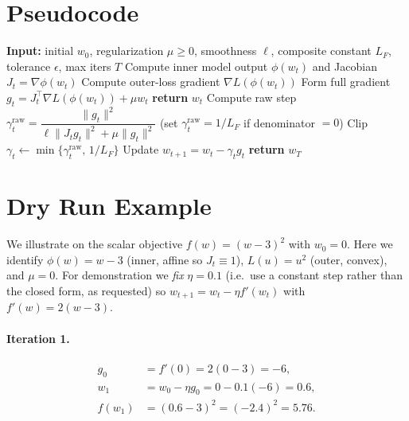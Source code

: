 \documentclass[11pt]{article}
\begin{document}
\section*{Pseudocode}

\begin{algorithm}[H]
\caption{Deep Frank-Wolfe (DFW) with safe closed-form step}
\begin{algorithmic}[1]
\State \textbf{Input:} initial $w_0$, regularization $\mu \ge 0$, smoothness $\ell$, composite constant $L_F$, tolerance $\epsilon$, max iters $T$
  \State Compute inner model output $\phi(w_t)$ and Jacobian $J_t = \nabla\phi(w_t)$
  \State Compute outer-loss gradient $\nabla L(\phi(w_t))$
  \State Form full gradient $g_t = J_t^\top \nabla L(\phi(w_t)) + \mu w_t$
   \State \textbf{return} $w_t$ \EndIf
  \State Compute raw step
         $\gamma_t^{\mathrm{raw}} = \dfrac{\|g_t\|^2}{\ell\|J_t g_t\|^2 + \mu\|g_t\|^2}$
         \quad (set $\gamma_t^{\mathrm{raw}} = 1/L_F$ if denominator $=0$)
  \State Clip $\gamma_t \gets \min\{\gamma_t^{\mathrm{raw}},\, 1/L_F\}$
  \State Update $w_{t+1} = w_t - \gamma_t g_t$
\EndFor
\State \textbf{return} $w_T$
\end{algorithmic}
\end{algorithm}

\section*{Dry Run Example}

We illustrate on the scalar objective $f(w) = (w-3)^2$ with $w_0 = 0$.
Here we identify $\phi(w) = w-3$ (inner, affine so $J_t \equiv 1$),
$L(u) = u^2$ (outer, convex), and $\mu = 0$. For demonstration we
\emph{fix} $\eta = 0.1$ (i.e.\ use a constant step rather than the closed
form, as requested) so $w_{t+1} = w_t - \eta f'(w_t)$ with
$f'(w) = 2(w-3)$.

\paragraph{Iteration 1.}
\begin{align*}
g_0 &= f'(0) = 2(0-3) = -6,\\
w_1 &= w_0 - \eta g_0 = 0 - 0.1(-6) = 0.6,\\
f(w_1) &= (0.6-3)^2 = (-2.4)^2 = 5.76.
\end{align*}
\end{document}
